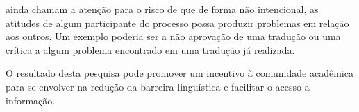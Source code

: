  ainda chamam a atenção para o risco de que de forma não intencional, as atitudes de algum participante do processo possa produzir problemas em relação aos outros. Um exemplo poderia ser a não aprovação de uma tradução ou uma crítica a algum problema encontrado em uma tradução já realizada.

O resultado desta pesquisa pode promover um incentivo à comunidade acadêmica para se envolver na redução da barreira linguística e facilitar o acesso a informação.

